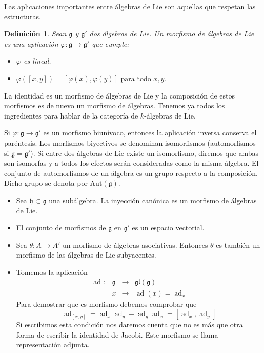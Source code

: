\documentclass[a4paper,draft,12pt]{article}
\newtheorem{defi}{Definición}[section]%
\newcommand{\g}{\mathfrak{g}}%
\newcommand{\lto}{\longrightarrow}%
\newcommand{\df}[1]{\textsf{\color{blue}#1}}
\DeclareMathOperator{\ad}{ad}  %
\begin{document}
Las aplicaciones importantes entre álgebras de Lie son aquellas que respetan las estructuras.

\begin{defi}
Sean $\g$ y $\g'$  dos álgebras de Lie. Un  \df{morfismo de álgebras de Lie}  es una aplicación $\varphi : \g \rightarrow  \g'$   que cumple:
\begin{itemize}
\item $\varphi$ es lineal.
\item $\varphi ([x,y]) = [\varphi(x),\varphi(y)] \text{ para todo } x,y$.
\end{itemize}
\end{defi}

La identidad es un morfismo de álgebras de Lie y la composición de estos morfismos es de nuevo un morfismo de álgebras. Tenemos ya todos los ingredientes para hablar de la categoría de  $k$-álgebras de Lie. 

Si $\varphi: \g \rightarrow \g'$ es un morfismo biunívoco, entonces la aplicación inversa conserva el paréntesis.  Los morfismos biyectivos se denominan  \df{isomorfismos}  (\df{automorfismos} si $\g= \g'$).   Si entre dos álgebras de Lie existe un isomorfismo, diremos que ambas son isomorfas y a todos los efectos serán consideradas como la misma álgebra. El conjunto de automorfismos de un álgebra es un grupo respecto a la composición.  Dicho grupo se denota por $\textrm{Aut}(\g)$.


\bigskip


\begin{itemize}

\item Sea $\mathfrak{h} \subset \g$ una subálgebra. La inyección canónica es un morfismo de álgebras de Lie.

\item  El conjunto de morfismos de $\g$ en $\g'$ es un espacio vectorial.

\item Sea $\theta:A\rightarrow A'$ un morfismo de álgebras asociativas.  Entonces $\theta$ es también un morfismo de las álgebras de Lie subyacentes.

\item Tomemos la aplicación
$$
\begin{array}{cccc}
 \ad: & \g & \lto & \mathfrak{gl}(\g) \\
    & x & \lto & \ad(x)= \ad_x
    \end{array}
    $$
Para demostrar que es morfismo debemos comprobar que 
$$
\ad_{[x,y]}= \ad_x\ad_y-\ad_y\ad_x= [\ad_x,\ad_y]
$$
Si escribimos esta condición nos daremos cuenta que no es más que otra forma de escribir la identidad de Jacobi.  Este morfismo se llama  \df{representación adjunta}. 




\end{itemize}
\end{document}
